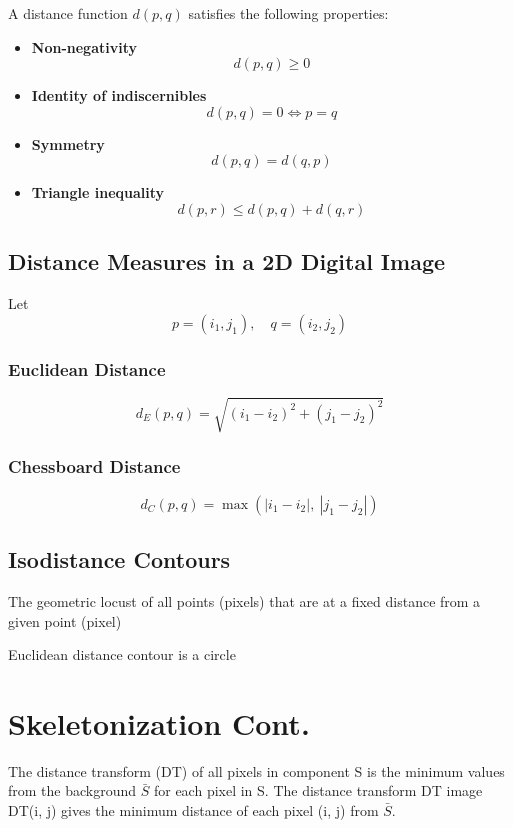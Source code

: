 \documentclass[11pt]{article}
\theoremstyle{definition}
\begin{document}
A distance function $d(p,q)$ satisfies the following properties:

\begin{itemize}
\item \textbf{Non-negativity}
\[
d(p,q) \ge 0
\]

\item \textbf{Identity of indiscernibles}
\[
d(p,q) = 0 \iff p = q
\]

\item \textbf{Symmetry}
\[
d(p,q) = d(q,p)
\]

\item \textbf{Triangle inequality}
\[
d(p,r) \le d(p,q) + d(q,r)
\]
\end{itemize}

\subsection{Distance Measures in a 2D Digital Image}

Let
\[
p = (i_1, j_1), \quad q = (i_2, j_2)
\]

\subsubsection{Euclidean Distance}

\[
d_E(p,q) = \sqrt{(i_1 - i_2)^2 + (j_1 - j_2)^2}
\]

\subsubsection{Chessboard Distance}

\[
d_C(p,q) = \max \left( |i_1 - i_2|,\ |j_1 - j_2| \right)
\]


\subsection{Isodistance Contours}

The geometric locust of all points (pixels) that are at a fixed distance from a given point (pixel)

Euclidean distance contour is a circle 


\newpage
\section*{Skeletonization Cont.}
The distance transform (DT) of all pixels in component S is the minimum values from the background $\bar S$ for each pixel in S. The distance transform DT image DT(i, j) gives the minimum distance of each pixel (i, j) from $\bar S$.
\end{document}
